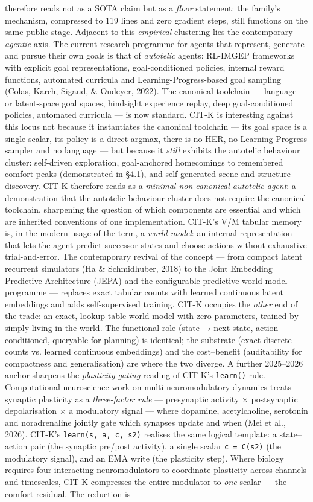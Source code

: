 \documentclass[11pt]{article}
\begin{document}
therefore reads not as a SOTA claim but as a \emph{floor} statement: the family's mechanism, compressed to 119 lines and zero gradient steps, still functions on the same public stage. Adjacent to this \emph{empirical} clustering lies the contemporary \emph{agentic} axis. The current research programme for agents that represent, generate and pursue their own goals is that of \emph{autotelic} agents: RL-IMGEP frameworks with explicit goal representations, goal-conditioned policies, internal reward functions, automated curricula and Learning-Progress-based goal sampling (Colas, Karch, Sigaud, \& Oudeyer, 2022). The canonical toolchain — language- or latent-space goal spaces, hindsight experience replay, deep goal-conditioned policies, automated curricula — is now standard. CIT-K is interesting against this locus not because it instantiates the canonical toolchain — its goal space is a single scalar, its policy is a direct argmax, there is no HER, no Learning-Progress sampler and no language — but because it \emph{still} exhibits the autotelic behaviour cluster: self-driven exploration, goal-anchored homecomings to remembered comfort peaks (demonstrated in §4.1), and self-generated scene-and-structure discovery. CIT-K therefore reads as a \emph{minimal non-canonical autotelic agent}: a demonstration that the autotelic behaviour cluster does not require the canonical toolchain, sharpening the question of which components are essential and which are inherited conventions of one implementation. CIT-K's V/M tabular memory is, in the modern usage of the term, a \emph{world model}: an internal representation that lets the agent predict successor states and choose actions without exhaustive trial-and-error. The contemporary revival of the concept — from compact latent recurrent simulators (Ha \& Schmidhuber, 2018) to the Joint Embedding Predictive Architecture (JEPA) and the configurable-predictive-world-model programme — replaces exact tabular counts with learned continuous latent embeddings and adds self-supervised training. CIT-K occupies the \emph{other} end of the trade: an exact, lookup-table world model with zero parameters, trained by simply living in the world. The functional role (state → next-state, action-conditioned, queryable for planning) is identical; the substrate (exact discrete counts vs. learned continuous embeddings) and the cost–benefit (auditability for compactness and generalisation) are where the two diverge. A further 2025–2026 anchor sharpens the \emph{plasticity-gating} reading of CIT-K's \texttt{learn()} rule. Computational-neuroscience work on multi-neuromodulatory dynamics treats synaptic plasticity as a \emph{three-factor rule} — presynaptic activity × postsynaptic depolarisation × a modulatory signal — where dopamine, acetylcholine, serotonin and noradrenaline jointly gate which synapses update and when (Mei et al., 2026). CIT-K's \texttt{learn(s, a, c, s2)} realises the same logical template: a state–action pair (the synaptic pre/post activity), a single scalar \texttt{c = C(s2)} (the modulatory signal), and an EMA write (the plasticity step). Where biology requires four interacting neuromodulators to coordinate plasticity across channels and timescales, CIT-K compresses the entire modulator to \emph{one} scalar — the comfort residual. The reduction is 
\end{document}
